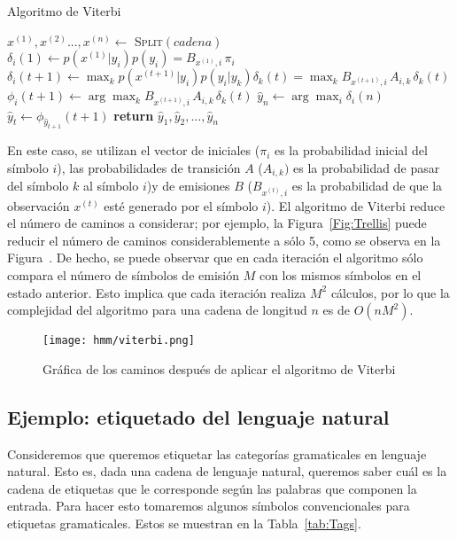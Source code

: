 \begin{algorithm}
 \caption{Algoritmo de Viterbi}\label{alg:Viterbi}
 \begin{algorithmic}
    \State $x^{(1)},x^{(2)}...,x^{(n)} \leftarrow$ \textsc{Split}$(cadena)$
    \State $\delta_i(1) \leftarrow p(x^{(1)}|y_i) p(y_i) = B_{x^{(1)}, i}\, \pi_i$ 
      \State $\delta_i(t+1) \leftarrow \max_k p(x^{(t+1)}|y_i)p(y_i|y_k)\delta_k(t) = \max_k B_{ x^{(t+1)}, i}\, A_{i,k}\, \delta_k(t) $
      \State $\phi_i(t+1) \leftarrow \arg\max_k B_{ x^{(t+1)}, i}\, A_{i,k}\, \delta_k(t) $
    \EndFor
    \State $\hat{y}_n \leftarrow \arg\max_i \delta_i(n)$
     \State $\hat{y}_t \leftarrow \phi_{\hat{y}_{t+1}}(t+1)$
    \EndFor
    \State \textbf{return} $\hat{y}_1, \hat{y}_2, ..., \hat{y}_n $
  \EndFunction
 \end{algorithmic}
\end{algorithm}

En este caso, se utilizan el vector de iniciales ($\pi_i$ es la probabilidad inicial del símbolo $i$), las probabilidades de transición $A$ ($A_{i, k})$ es la probabilidad de pasar del símbolo $k$ al símbolo $i$)y de emisiones $B$ ($B_{ x^{(t)}, i}$ es la probabilidad de que la observación $x^{(t)}$ esté generado por el símbolo $i$). El algoritmo de Viterbi reduce el número de caminos a considerar; por ejemplo, la Figura~\ref{Fig:Trellis} puede reducir el número de caminos considerablemente a sólo 5, como se observa en la Figura~. De hecho, se puede observar que en cada iteración el algoritmo sólo compara el número de símbolos de emisión $M$ con los mismos símbolos en el estado anterior. Esto implica que cada iteración realiza $M^2$ cálculos, por lo que la complejidad del algoritmo para una cadena de longitud $n$ es de $O(nM^2)$. 

\begin{figure}
    \centering
    \texttt{[image: hmm/viterbi.png]}
    \caption{Gráfica de los caminos después de aplicar el algoritmo de Viterbi}
    \label{Fig:Viterbi}
\end{figure}


\subsection{Ejemplo: etiquetado del lenguaje natural}

Consideremos que queremos etiquetar las categorías gramaticales en lenguaje natural. Esto es, dada una cadena de lenguaje natural, queremos saber cuál es la cadena de etiquetas que le corresponde según las palabras que componen la entrada. Para hacer esto tomaremos algunos símbolos convencionales para etiquetas gramaticales. Estos se muestran en la Tabla~\ref{tab:Tags}.

